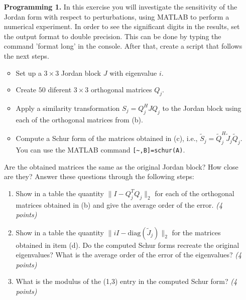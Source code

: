 \documentclass[14pt]{report}
\begin{document}
\begin{enumerate}
\pagebreak

  \item[\textbf{Programming 1.}] In this exercise you will investigate the
    sensitivity of the Jordan form with respect to perturbations, using MATLAB
    to perform a numerical experiment. In order to see the significant
    digits in the results, set the output format to double precision. This can
    be done by typing the command 'format long' in the console. After that,
    create a script that follows the next steps.

    \begin{itemize}
      \item Set up a $3\times3$ Jordan block $J$ with eigenvalue $i$.
      \item Create $50$ diferent $3\times3$ orthogonal matrices $Q_j$.
      \item Apply a similarity transformation ${S}_j=Q^H_jJQ_j$ to the
        Jordan block using each of the orthogonal matrices from (b).
      \item Compute a Schur form of the matrices obtained in (c), i.e., $\tilde{S}_{j}=\tilde{Q}^H_j\tilde{J}_j\tilde{Q}_j$. You can use the MATLAB command \verb+[~,B]=schur(A)+.
\end{itemize}

Are the obtained matrices the same as the original Jordan block? How
    close are they? Answer these questions through the following steps:
    \begin{enumerate}
        \item Show in a table the quantity $\|I-Q_j^TQ_j\|_2$ for each of the orthogonal
          matrices obtained in (b) and give the average order of the error. \textit{(4 points)}
        \item Show in a table the quantity $\|iI-\text{diag}(\tilde{J}_j)\|_2$ for the matrices obtained in item (d). Do the computed Schur forms recreate the original eigenvalues? What is the average order of the error of the eigenvalues? \textit{(4 points)}
        \item What is the modulus of the (1,3) entry in the computed Schur form? \textit{(4 points)}
  \end{enumerate}

  \end{enumerate}
\end{document}
